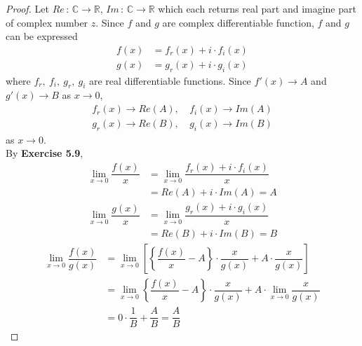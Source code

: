 \documentclass[12pt]{book}
\theoremstyle{definition}
\newcommand{\R}{\mathbb{R}}
\newcommand{\C}{\mathbb{C}}
\begin{document}
		\begin{proof}
			Let $Re\,:\,\C\rightarrow \R$, $Im\,:\,\C\rightarrow\R$ which each returns real part and imagine part of complex number $z$.
			Since $f$ and $g$ are complex differentiable function, $f$ and $g$ can be expressed
			\begin{align*}
				f(x)&=f_r(x)+i\cdot f_i(x) \\ g(x)&=g_r(x)+i\cdot g_i(x)
			\end{align*}
			where $f_r,~f_i,~g_r,~g_i$ are real differentiable functions.
			Since $f'(x)\rightarrow A$ and $g'(x)\rightarrow B$ as $x\rightarrow 0$,
			\begin{align*}
				f_r(x) \rightarrow Re(A),&~f_i(x) \rightarrow Im(A)\\
				g_r(x) \rightarrow Re(B),&~g_i(x) \rightarrow Im(B)
			\end{align*}
			as $x\rightarrow0$.\\
			By \textbf{Exercise 5.9},
			\begin{align*}
				\displaystyle\lim_{x\rightarrow 0} \dfrac{f(x)}{x}&=\displaystyle\lim_{x\rightarrow 0} \dfrac{f_r(x)+i\cdot f_i(x)}{x}\\
				&=Re(A)+i\cdot Im(A)=A\\
				\displaystyle\lim_{x\rightarrow 0} \dfrac{g(x)}{x}&=\displaystyle\lim_{x\rightarrow 0}\dfrac{g_r(x)+i\cdot g_i(x)}{x}\\
				&=Re(B)+i\cdot Im(B)=B
			\end{align*}
			\begin{align*}
				\displaystyle\lim_{x\rightarrow 0}\dfrac{f(x)}{g(x)}&=\displaystyle\lim_{x\rightarrow 0}\left[\left\{\dfrac{f(x)}{x}-A\right\}\cdot\dfrac{x}{g(x)}+A\cdot\dfrac{x}{g(x)}\right]\\
				&=\displaystyle\lim_{x\rightarrow 0}\left\{\dfrac{f(x)}{x}-A\right\}\cdot\dfrac{x}{g(x)}+A\cdot\lim_{x\rightarrow 0}\dfrac{x}{g(x)}\\
				&=0\cdot \dfrac{1}{B}+\dfrac{A}{B}=\dfrac{A}{B}
			\end{align*}
		\end{proof}
		\newpage
		\setcounter{example}{17}
\end{document}
